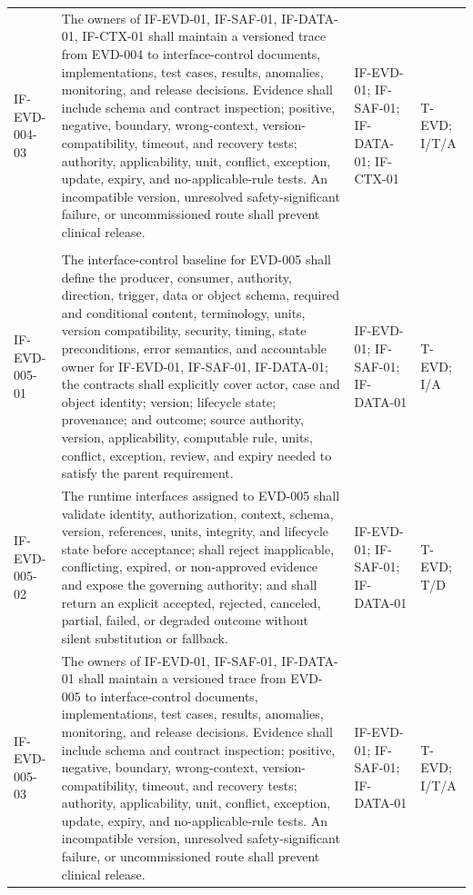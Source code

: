 \documentclass[11pt,letterpaper]{article}
\begin{document}
\begin{scriptsize}
\begin{longtable}{@{}L{0.14\textwidth}L{0.49\textwidth}L{0.19\textwidth}L{0.10\textwidth}@{}}
\addlinespace[2pt]
\mbox{IF-EVD-004-03} & The owners of IF-EVD-01, IF-SAF-01, IF-DATA-01, IF-CTX-01 shall maintain a versioned trace from EVD-004 to interface-control documents, implementations, test cases, results, anomalies, monitoring, and release decisions. Evidence shall include schema and contract inspection; positive, negative, boundary, wrong-context, version-compatibility, timeout, and recovery tests; authority, applicability, unit, conflict, exception, update, expiry, and no-applicable-rule tests. An incompatible version, unresolved safety-significant failure, or uncommissioned route shall prevent clinical release. & IF-EVD-01; IF-SAF-01; IF-DATA-01; IF-CTX-01 & T-EVD; I\slash\allowbreak{}T\slash\allowbreak{}A \\
\addlinespace[2pt]
 \\
\addlinespace[2pt]
\mbox{IF-EVD-005-01} & The interface-control baseline for EVD-005 shall define the producer, consumer, authority, direction, trigger, data or object schema, required and conditional content, terminology, units, version compatibility, security, timing, state preconditions, error semantics, and accountable owner for IF-EVD-01, IF-SAF-01, IF-DATA-01; the contracts shall explicitly cover actor, case and object identity; version; lifecycle state; provenance; and outcome; source authority, version, applicability, computable rule, units, conflict, exception, review, and expiry needed to satisfy the parent requirement. & IF-EVD-01; IF-SAF-01; IF-DATA-01 & T-EVD; I\slash\allowbreak{}A \\
\addlinespace[2pt]
\mbox{IF-EVD-005-02} & The runtime interfaces assigned to EVD-005 shall validate identity, authorization, context, schema, version, references, units, integrity, and lifecycle state before acceptance; shall reject inapplicable, conflicting, expired, or non-approved evidence and expose the governing authority; and shall return an explicit accepted, rejected, canceled, partial, failed, or degraded outcome without silent substitution or fallback. & IF-EVD-01; IF-SAF-01; IF-DATA-01 & T-EVD; T\slash\allowbreak{}D \\
\addlinespace[2pt]
\mbox{IF-EVD-005-03} & The owners of IF-EVD-01, IF-SAF-01, IF-DATA-01 shall maintain a versioned trace from EVD-005 to interface-control documents, implementations, test cases, results, anomalies, monitoring, and release decisions. Evidence shall include schema and contract inspection; positive, negative, boundary, wrong-context, version-compatibility, timeout, and recovery tests; authority, applicability, unit, conflict, exception, update, expiry, and no-applicable-rule tests. An incompatible version, unresolved safety-significant failure, or uncommissioned route shall prevent clinical release. & IF-EVD-01; IF-SAF-01; IF-DATA-01 & T-EVD; I\slash\allowbreak{}T\slash\allowbreak{}A \\

\end{longtable}
\end{scriptsize}
\end{document}
